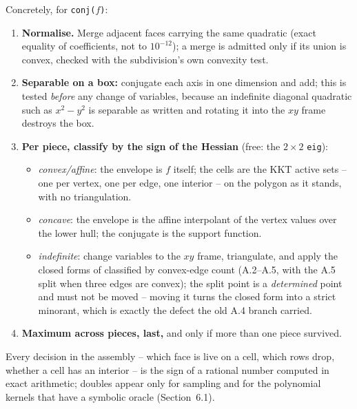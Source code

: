 \documentclass[11pt]{article}
\theoremstyle{definition}
\begin{document}
Concretely, for \texttt{conj($f$)}:
\begin{enumerate}[leftmargin=*]
\item \textbf{Normalise.} Merge adjacent faces carrying the same quadratic
  (exact equality of coefficients, not to $10^{-12}$); a merge is admitted only
  if its union is convex, checked with the subdivision's own convexity test.
\item \textbf{Separable on a box:} conjugate each axis in one dimension and
  add; this is tested \emph{before} any change of variables, because an
  indefinite diagonal quadratic such as $x^2-y^2$ is separable as written and
  rotating it into the $xy$ frame destroys the box.
\item \textbf{Per piece, classify by the sign of the Hessian} (free: the
  $2\times2$ \texttt{eig}):
  \begin{itemize}[nosep,leftmargin=*]
  \item \emph{convex/affine}: the envelope is $f$ itself; the cells are the
    KKT active sets -- one per vertex, one per edge, one interior -- on the
    polygon as it stands, with no triangulation.
  \item \emph{concave}: the envelope is the affine interpolant of the vertex
    values over the lower hull; the conjugate is the support function.
  \item \emph{indefinite}: change variables to the $xy$ frame, triangulate, and
    apply the closed forms of \citet{KARMARKAR-25} classified by convex-edge
    count (A.2--A.5, with the A.5 split when three edges are convex); the
    split point is a \emph{determined} point and must not be moved -- moving it
    turns the closed form into a strict minorant, which is exactly the defect
    the old A.4 branch carried.
  \end{itemize}
\item \textbf{Maximum across pieces, last,} and only if more than one piece
  survived.
\end{enumerate}

Every decision in the assembly -- which face is live on a cell, which rows drop,
whether a cell has an interior -- is the sign of a rational number computed in
exact arithmetic; doubles appear only for sampling and for the polynomial
kernels that have a symbolic oracle (Section~6.1).
\end{document}

